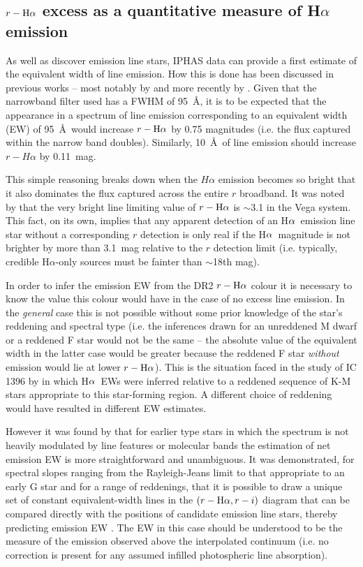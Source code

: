 \documentclass[a4paper,useAMS,usenatbib]{mn2e}
\def\ha{\mbox{H$\rm \alpha$}}
\begin{document}
\subsection{$r - \ha$ excess as a quantitative measure of H$\alpha$ emission}

{ \bf

As well as discover emission line stars, IPHAS data can provide a
first estimate of the equivalent width of line emission.
How this is done has been discussed in previous works 
-- most notably by \citet{Drew2005}
and more recently by \cite{Barentsen2011a}.
Given that the narrowband filter used has a FWHM of 95~\AA ,
it is to be expected that the appearance
in a spectrum of line emission corresponding to an equivalent width (EW)
of 95~\AA\ would increase $r - \ha$ by 0.75 magnitudes
(i.e. the flux captured within the narrow band doubles).
Similarly, 10~\AA\ of line emission
should increase $r - H\alpha$ by 0.11~mag.

This simple reasoning breaks down
when the $H\alpha$ emission becomes so bright
that it also dominates the flux captured across the entire $r$ broadband.
It was noted by \cite{Drew2005}
that the very bright line limiting value 
of $r - \ha$ is $\sim$3.1 in the Vega system.
This fact, on its own, implies that any apparent detection
of an \ha\ emission line star without a corresponding $r$ 
detection is only real if the \ha\ magnitude is not brighter 
by more than 3.1~mag relative to the $r$ detection limit
(i.e. typically, credible H$\alpha$-only sources
must be fainter than $\sim$18th mag).  

In order to infer the emission EW from the DR2 $r - \ha$ colour
it is necessary to know the value this colour would have
in the case of no excess line emission.
In the {\em general} case this is not possible
without some prior knowledge of the star's reddening and spectral type
(i.e. the inferences drawn for an unreddened M dwarf or
a reddened F star would not be the same -- the absolute value of the 
equivalent width in the latter case would be greater because the 
reddened F star {\em without} emission would lie at lower $r -\ha$).
This is the situation faced in the study of IC 1396 by
\cite{Barentsen2011a} in which \ha\ EWs were inferred
relative to a reddened sequence of K-M stars
appropriate to this star-forming region.
A different choice of reddening would have resulted
in different EW estimates.

However it was found by \cite{Drew2005}
that for earlier type stars in which the spectrum
is not heavily modulated by line features or molecular bands
the estimation of net emission EW is more straightforward and unambiguous.  
It was demonstrated, for spectral slopes ranging
from the Rayleigh-Jeans limit to that appropriate to an early G star
and for a range of reddenings,
that it is possible to draw a unique set of constant equivalent-width 
lines in the $(r - \ha, r - i)$ diagram
that can be compared directly with the positions
of candidate emission line stars,
thereby predicting emission EW \citep[see fig.~6, ][]{Drew2005}.
The EW in this case should be understood
to be the measure of the emission observed
above the interpolated continuum
(i.e. no correction is present
for any assumed infilled photospheric line absorption).

}
\end{document}
